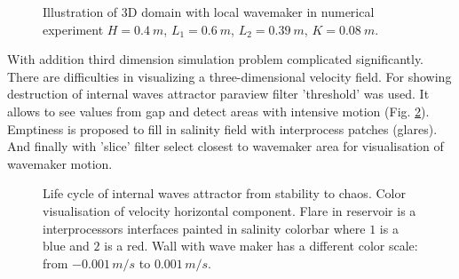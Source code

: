 \documentclass[a4wide,fontsize=12pt]{article}
\begin{document}
\begin{figure}
      
    \caption{Illustration of 3D domain with local wavemaker in numerical experiment $H=0.4\ m$, $L_1 = 0.6\ m$, $L_2 = 0.39\ m$, $K=0.08 \ m$.}
    \label{fig:3DLocSctarch}
\end{figure}

With addition third dimension simulation problem complicated significantly. There are difficulties in visualizing a three-dimensional velocity field. For showing destruction of internal waves attractor paraview filter 'threshold' was used. It allows to see values from gap and detect areas with intensive motion (Fig. \ref{fig:3DLocTurbRes}). Emptiness is proposed to fill in salinity field with interprocess patches (glares). And finally with 'slice' filter select closest to wavemaker area for visualisation of wavemaker motion. 



\begin{figure}[!ht]
\centering
    \begin{minipage}{0.45\textwidth}
        \centering
        \label{fig:3DTurbBegin}
    \end{minipage}
    \begin{minipage}{0.45\textwidth}
        \centering
        \label{fig:3DTurbEnd}
    \end{minipage}
    \caption{Life cycle of internal waves attractor from stability to chaos. Color visualisation of velocity horizontal component. Flare in reservoir is a interprocessors interfaces painted in salinity colorbar where $1$ is a blue and $2$ is a red. Wall with wave maker has a different color scale: from $-0.001\,m/s$ to $0.001\,m/s$.}
    \label{fig:3DLocTurbRes}
\end{figure}
\end{document}
